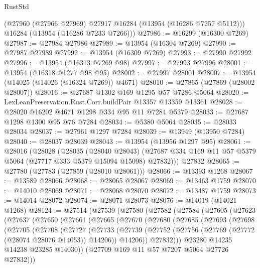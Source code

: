 \begin{lexlean}{RustStd}
\begin{coremodule}
      (@27960 (@27966 @27969) @27917 @16284 (@13954 (@16286 @7257 @5112)))
      @16284
      (@13954 (@16286 @7233 @7266)))
@27986 := @16299 (@16300 @7269)
@27987 := @27984 @27986
@27989 := @13954 (@16304 @7269)
@27990 := @27987 @27989
@27992 := @13954 (@16309 @7269)
@27993 := @27990 @27992
@27996 := @13954 (@16313 @7269 @98)
@27997 := @27993 @27996
@28001 := @13954 (@16318 @1277 @98 @95)
@28002 := @27997 @28001
@28007 := @13954 (@14025 (@14026 (@16324 @7269)) @4671)
@28010 := @27865 (@27869 (@28002 @28007))
@28016 := @27687 @1302 @169 @1295 @57 @7286 @5064
@28020 := LexLeanPreservation.Rust.Corr.buildPair @13357 @13359 @13361
@28028 := @28020 @16202 @4671 @1298 @334 @95 @11 @7284 @5379
@28033 := @27687 @1298 @1300 @95 @76 @7284
@28034 := @5380 @5064
@28035 := @28033 @28034
@28037 := @27961 @1297 @7284
@28039 := @13949 (@13950 @7284)
@28040 := @28037 @28039
@28043 := @13954 (@13956 @1297 @95)
@28061 := @28016
    (@28028
      (@28035
        (@28040 @28043)
        (@27687 @334 @169 @11 @57 @5379 @5064 (@27717 @333 @5379 @15094 @15098) @27832)))
    @27832
@28065 := @27780 (@27783 (@27859 (@28010 @28061)))
@28066 := @13393 @1268
@28067 := @13589 @28066
@28068 := @28065 @28067
@28069 := @13463 @1759
@28070 := @14010 @28069
@28071 := @28068 @28070
@28072 := @13487 @1759
@28073 := @14014 @28072
@28074 := @28071 @28073
@28076 := @14019 (@14021 @1268)
@28124 := @27514
    (@27539
      (@27580
        (@27582
          (@27584
            (@27605
              (@27623
                (@27637
                  (@27650
                    (@27661
                      (@27665
                        (@27670
                          (@27680
                            (@27685
                              (@27693
                                (@27698
                                  (@27705
                                    (@27708
                                      (@27727
                                        (@27733
                                          (@27739
                                            (@27752
                                              (@27756
                                                (@27769 (@27772 (@28074 @28076 @14053)) @14206))
                                              @14206))
                                          @27832)))
                                    @23280
                                    @14235
                                    @14238
                                    @23285
                                    @14030))
                                (@27709 @169 @11 @57 @7207 @5064 @27726 @27832)))

\end{coremodule}
\end{lexlean}
